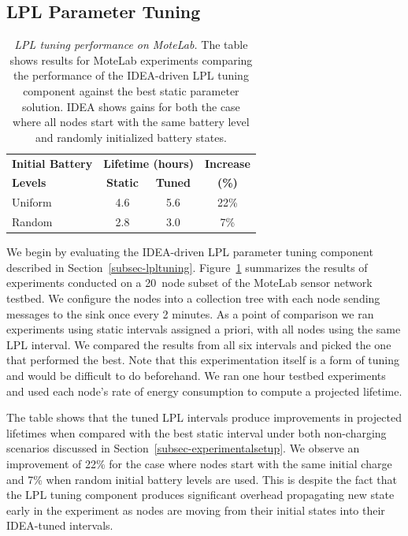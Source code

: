 \documentclass{sig-alternate}
\begin{document}
\subsection{LPL Parameter Tuning}
\label{subsec-lplparametertuning}

\begin{table}[t]
\begin{center}
\begin{tabular}{|l|ccc|}
\hline
\textbf{Initial Battery} & \multicolumn{2}{c}{\textbf{Lifetime (hours)}} & \textbf{Increase} \\
\textbf{Levels} & \textbf{Static} & \textbf{Tuned} & \textbf{(\%)} \\ \hline
Uniform & 4.6 & 5.6 & 22\% \\
Random & 2.8 & 3.0 & 7\% \\ \hline
\end{tabular}
\end{center}

\caption{\textit{LPL tuning performance on MoteLab.} The table shows results
for MoteLab experiments comparing the performance of the IDEA-driven LPL
tuning component against the best static parameter solution. IDEA shows gains
for both the case where all nodes start with the same battery level and
randomly initialized battery states.}

\label{table-lplvoptimalmotelab}
\end{table}

We begin by evaluating the IDEA-driven LPL parameter tuning component
described in Section~\ref{subsec-lpltuning}.
Figure~\ref{table-lplvoptimalmotelab} summarizes the results of experiments
conducted on a 20~node subset of the MoteLab sensor network testbed. We
configure the nodes into a collection tree with each node sending messages to
the sink once every 2 minutes. As a point of comparison we ran experiments
using static intervals assigned a priori, with all nodes using the same LPL
interval. We compared the results from all six intervals and picked the one
that performed the best. Note that this experimentation itself is a form of
tuning and would be difficult to do beforehand. We ran one hour testbed
experiments and used each node's rate of energy consumption to compute a
projected lifetime.

The table shows that the tuned LPL intervals produce improvements in
projected lifetimes when compared with the best static interval under both
non-charging scenarios discussed in Section~\ref{subsec-experimentalsetup}.
We observe an improvement of 22\% for the case where nodes start with the
same initial charge and 7\% when random initial battery levels are used. This
is despite the fact that the LPL tuning component produces significant
overhead propagating new state early in the experiment as nodes are moving
from their initial states into their IDEA-tuned intervals.
\end{document}
